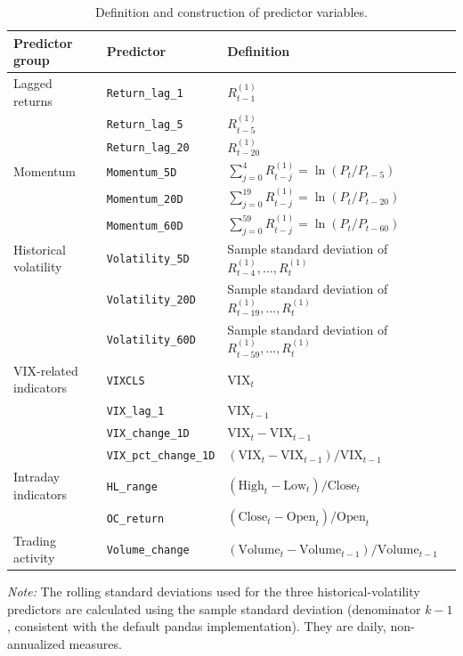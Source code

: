 \documentclass[12pt,twoside]{ord}
\begin{document}
\begin{table}[htbp]
\centering
\caption{Definition and construction of predictor variables.}\label{tab:predictor_definitions}
\setlength{\tabcolsep}{6pt}
\renewcommand{\arraystretch}{1.2}
\begin{tabular}{lll}
\hline
Predictor group & Predictor & Definition \\
\hline
Lagged returns & \texttt{Return\_lag\_1} & $R_{t-1}^{(1)}$ \\
& \texttt{Return\_lag\_5} & $R_{t-5}^{(1)}$ \\
& \texttt{Return\_lag\_20} & $R_{t-20}^{(1)}$ \\
\hline
Momentum & \texttt{Momentum\_5D} & $\sum_{j=0}^{4} R_{t-j}^{(1)} = \ln(P_t/P_{t-5})$ \\
& \texttt{Momentum\_20D} & $\sum_{j=0}^{19} R_{t-j}^{(1)} = \ln(P_t/P_{t-20})$ \\
& \texttt{Momentum\_60D} & $\sum_{j=0}^{59} R_{t-j}^{(1)} = \ln(P_t/P_{t-60})$ \\
\hline
Historical volatility & \texttt{Volatility\_5D} & Sample standard deviation of $R_{t-4}^{(1)},\dots,R_t^{(1)}$ \\
& \texttt{Volatility\_20D} & Sample standard deviation of $R_{t-19}^{(1)},\dots,R_t^{(1)}$ \\
& \texttt{Volatility\_60D} & Sample standard deviation of $R_{t-59}^{(1)},\dots,R_t^{(1)}$ \\
\hline
VIX-related indicators & \texttt{VIXCLS} & $\text{VIX}_t$ \\
& \texttt{VIX\_lag\_1} & $\text{VIX}_{t-1}$ \\
& \texttt{VIX\_change\_1D} & $\text{VIX}_t - \text{VIX}_{t-1}$ \\
& \texttt{VIX\_pct\_change\_1D} & $(\text{VIX}_t - \text{VIX}_{t-1})/\text{VIX}_{t-1}$ \\
\hline
Intraday indicators & \texttt{HL\_range} & $(\text{High}_t - \text{Low}_t)/\text{Close}_t$ \\
& \texttt{OC\_return} & $(\text{Close}_t - \text{Open}_t)/\text{Open}_t$ \\
\hline
Trading activity & \texttt{Volume\_change} & $(\text{Volume}_t - \text{Volume}_{t-1})/\text{Volume}_{t-1}$ \\
\hline
\end{tabular}
\par\vspace{4pt}\parbox{\linewidth}{\fontsize{9pt}{12pt}\selectfont\textit{Note:} The rolling standard deviations used for the three historical-volatility predictors are calculated using the sample standard deviation (denominator $k-1$, consistent with the default pandas implementation). They are daily, non-annualized measures.}
\end{table}
\end{document}
